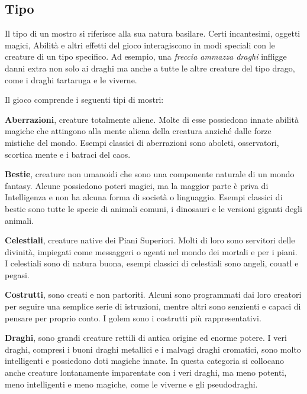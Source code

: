 \begin{multicols}{2}

	\subsection{Tipo}

	Il tipo di un mostro si riferisce alla sua natura basilare. Certi incantesimi, oggetti magici, Abilità e altri effetti del gioco interagiscono in modi speciali con le creature di un tipo specifico. Ad esempio, una \textit{freccia ammazza draghi} infligge danni extra non solo ai draghi ma anche a tutte le altre creature del tipo drago, come i draghi tartaruga e le viverne.

	Il gioco comprende i seguenti tipi di mostri:

	\smallskip\textbf{Aberrazioni}, creature totalmente aliene. Molte di esse possiedono innate abilità magiche che attingono alla mente aliena della creatura anziché dalle forze mistiche del mondo. Esempi classici di aberrazioni sono aboleti, osservatori, scortica mente e i batraci del caos.

	\smallskip\textbf{Bestie}, creature non umanoidi che sono una componente naturale di un mondo fantasy. Alcune possiedono poteri magici, ma la maggior parte è priva di Intelligenza e non ha alcuna forma di società o linguaggio. Esempi classici di bestie sono tutte le specie di animali comuni, i dinosauri e le versioni giganti degli animali.

	\smallskip\textbf{Celestiali}, creature native dei Piani Superiori. Molti di loro sono servitori delle divinità, impiegati come messaggeri o agenti nel mondo dei mortali e per i piani.\\
	I celestiali sono di natura buona, esempi classici di celestiali sono angeli, couatl e pegasi.

	\smallskip\textbf{Costrutti}, sono creati e non partoriti. Alcuni sono programmati dai loro creatori per seguire una semplice serie di istruzioni, mentre altri sono senzienti e capaci di pensare per proprio conto. I golem sono i costrutti più rappresentativi.

	\smallskip\textbf{Draghi}, sono grandi creature rettili di antica origine ed enorme potere. I veri draghi, compresi i buoni draghi metallici e i malvagi draghi cromatici, sono molto intelligenti e possiedono doti magiche innate. In questa categoria si collocano anche creature lontanamente imparentate con i veri draghi, ma meno potenti, meno intelligenti e meno magiche, come le viverne e gli pseudodraghi.


\end{multicols}

